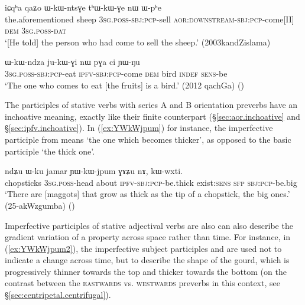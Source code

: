 \begin{exe}
\ex \label{ex:WkWntsGe.thWkWGe}
\gll iɕqʰa qaʑo ɯ-kɯ-ntsɣe tʰɯ-kɯ-ɣe nɯ ɯ-pʰe \\
the.aforementioned sheep \textsc{3sg}.\textsc{poss}-\textsc{sbj}:\textsc{pcp}-sell \textsc{aor}:\textsc{downstream}-\textsc{sbj}:\textsc{pcp}-come[II] \textsc{dem} \textsc{3sg}.\textsc{poss}-\textsc{dat} \\
\glt  `[He told] the person who had come to sell the sheep.' (2003kandZislama)
\end{exe}

\begin{exe}
\ex \label{ex:WkWndza.jukWGi}
\gll ɯ-kɯ-ndza ju-kɯ-ɣi nɯ pɣa ci ɲɯ-ŋu \\
\textsc{3sg}.\textsc{poss}-\textsc{sbj}:\textsc{pcp}-eat \textsc{ipfv}-\textsc{sbj}:\textsc{pcp}-come \textsc{dem} bird \textsc{indef} \textsc{sens}-be \\
\glt   `The one who comes to eat [the fruits] is a bird.' (2012 qachGa)
()
\end{exe}

The participles of stative verbs with series A and B orientation preverbs have an inchoative meaning, exactly like their finite counterpart (§\ref{sec:aor.inchoative} and §\ref{sec:ipfv.inchoative}).  In (\ref{ex:YWkWjpum}) for instance, the imperfective participle  from  means `the one which becomes thicker', as opposed to the basic participle  `the thick one'.

\begin{exe}
\ex \label{ex:YWkWjpum}
 \gll ndʑu ɯ-ku jamar ɲɯ-kɯ-jpum ɣɤʑu nɤ, kɯ-wxti.  \\
 chopsticks \textsc{3sg}.\textsc{poss}-head about \textsc{ipfv}-\textsc{sbj}:\textsc{pcp}-be.thick exist:\textsc{sens} \textsc{sfp} \textsc{sbj}:\textsc{pcp}-be.big \\
 \glt  `There are [maggots] that grow as thick as the tip of a chopstick, the big ones.' (25-akWzgumba)
()
\end{exe}

Imperfective participles of stative adjectival verbs are also can also describe the gradient variation of a property across space rather than time. For instance, in (\ref{ex:YWkWjpum2}), the imperfective subject participles  and  are used not to indicate a change across time, but to describe the shape of the gourd, which is progressively thinner towards the top and thicker towards the bottom (on the contrast between the \textsc{eastwards}  vs. \textsc{westwards}  preverbs in this context, see §\ref{sec:centripetal.centrifugal}).

